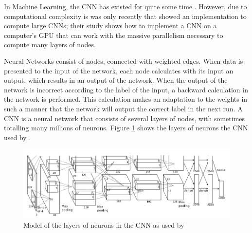 In Machine Learning, the CNN has existed for quite some time \citep{fukushima1980neocognition}.
However, due to computational complexity is was only recently that \citet{krizhevsky2012imagenet} showed an implementation to compute large CNNs;
their study shows how to implement a CNN on a computer's GPU that can work with the massive parallelism necessary to compute many layers of nodes.

Neural Networks consist of nodes, connected with weighted edges.
When data is presented to the input of the network, each node calculates with its input an output, which results in an output of the network.
When the output of the network is incorrect according to the label of the input, a backward calculation in the network is performed.
This calculation makes an adaptation to the weights in such a manner that the network will output the correct label in the next run.
A CNN is a neural network that consists of several layers of nodes, with sometimes totalling many millions of neurons.
Figure \ref{fig:cnn-alex} shows the layers of neurons the CNN used by \citet{krizhevsky2012imagenet}.

\begin{figure}%
\centering
\ifx\showfig\undefined
\includegraphics[keepaspectratio=true,width=\textwidth]{images/alexnet2012.png} \fi
\caption{Model of the layers of neurons in the CNN as used by \citet{krizhevsky2012imagenet}}
\label{fig:cnn-alex}
\end{figure}

